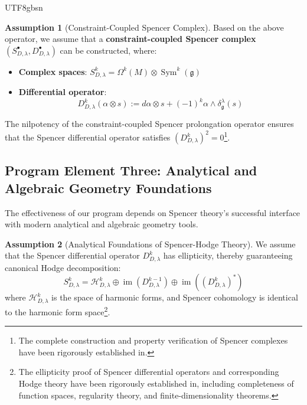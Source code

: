 \documentclass[a4paper,12pt]{extarticle}
\theoremstyle{definition}
\newtheorem{assumption}{Assumption}[theorem]
\begin{document}
\begin{CJK}{UTF8}{gbsn}
\begin{assumption}[Constraint-Coupled Spencer Complex]
\label{assumption:coupled_spencer_complex}
Based on the above operator, we assume that a \textbf{constraint-coupled Spencer complex} $(S^{\bullet}_{D,\lambda}, D^{\bullet}_{D,\lambda})$ can be constructed, where:
\begin{itemize}
    \item \textbf{Complex spaces}: $S^k_{D,\lambda} = \Omega^k(M) \otimes \operatorname{Sym}^k(\mathfrak{g})$
    \item \textbf{Differential operator}:
    \begin{equation}
    \label{eq:spencer_differential}
    D^k_{D,\lambda}(\alpha \otimes s) := d\alpha \otimes s + (-1)^k \alpha \wedge \delta^\lambda_\mathfrak{g}(s)
    \end{equation}
\end{itemize}
The nilpotency of the constraint-coupled Spencer prolongation operator ensures that the Spencer differential operator satisfies $(D^k_{D,\lambda})^2=0$\footnote{The complete construction and property verification of Spencer complexes have been rigorously established in\cite{zheng2025mirror}.}.
\end{assumption}

\subsection{Program Element Three: Analytical and Algebraic Geometry Foundations}
\label{subsec:analytical_algebraic_foundations}

The effectiveness of our program depends on Spencer theory's successful interface with modern analytical and algebraic geometry tools.

\begin{assumption}[Analytical Foundations of Spencer-Hodge Theory]
\label{assumption:analytical_foundation}
We assume that the Spencer differential operator $D^k_{D,\lambda}$ has ellipticity, thereby guaranteeing canonical Hodge decomposition:
\begin{equation}
\label{eq:hodge_decomposition}
S^k_{D,\lambda} = \mathcal{H}^k_{D,\lambda} \oplus \operatorname{im}(D^{k-1}_{D,\lambda}) \oplus \operatorname{im}((D^k_{D,\lambda})^*)
\end{equation}
where $\mathcal{H}^k_{D,\lambda}$ is the space of harmonic forms, and Spencer cohomology is identical to the harmonic form space\footnote{The ellipticity proof of Spencer differential operators and corresponding Hodge theory have been rigorously established in\cite{zheng2025constructing}, including completeness of function spaces, regularity theory, and finite-dimensionality theorems.}.
\end{assumption}


\end{CJK}
\end{document}
